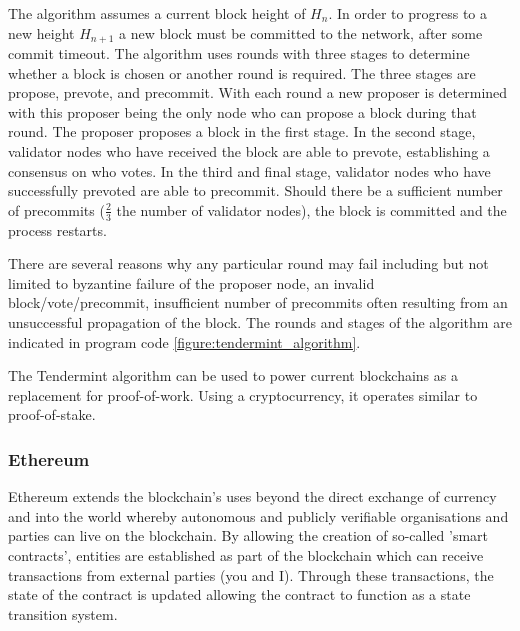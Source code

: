 The algorithm assumes a current block height of $H_{n}$. In order to progress to a new height $H_{n+1}$ a new block must be committed to the network, after some commit timeout. The algorithm uses rounds with three stages to determine whether a block is chosen or another round is required. The three stages are propose, prevote, and precommit. With each round a new proposer is determined with this proposer being the only node who can propose a block during that round. The proposer proposes a block in the first stage. In the second stage, validator nodes who have received the block are able to prevote, establishing a consensus on who votes. In the third and final stage, validator nodes who have successfully prevoted are able to precommit. Should there be a sufficient number of precommits ($\frac{2}{3}$ the number of validator nodes), the block is committed and the process restarts.

There are several reasons why any particular round may fail including but not limited to byzantine failure of the proposer node, an invalid block/vote/precommit, insufficient number of precommits often resulting from an unsuccessful propagation of the block. The rounds and stages of the algorithm are indicated in program code \ref{figure:tendermint_algorithm}.



The Tendermint algorithm can be used to power current blockchains as a replacement for proof-of-work. Using a cryptocurrency, it operates similar to proof-of-stake.


\subsubsection{Ethereum}

Ethereum extends the blockchain's uses beyond the direct exchange of currency and into the world whereby autonomous and publicly verifiable organisations and parties can live on the blockchain. By allowing the creation of so-called 'smart contracts', entities are established as part of the blockchain which can receive transactions from external parties (you and I). Through these transactions, the state of the contract is updated allowing the contract to function as a state transition system.

